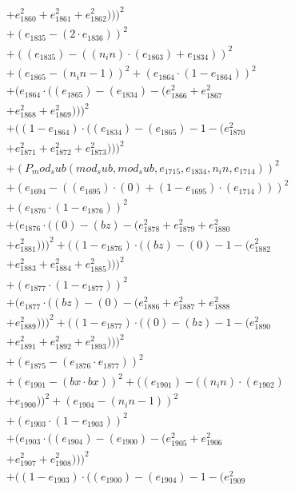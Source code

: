 \documentclass[10pt, a4paper]{article}
\begin{document}
\begin{align*}
& + e_{1860}^{2} + e_{1861}^{2} + e_{1862}^{2})))^{2} \\
& + (e_{1835} - (2  \cdot  e_{1836}))^{2} \\
& + ((e_{1835}) - ((n_in)  \cdot  (e_{1863}) + e_{1834}))^{2} \\
& + (e_{1865} - (n_in - 1))^{2} + (e_{1864}  \cdot  (1 - e_{1864}))^{2} \\
& + (e_{1864}  \cdot  ((e_{1865}) - (e_{1834}) - (e_{1866}^{2} + e_{1867}^{2} \\
& + e_{1868}^{2} + e_{1869}^{2})))^{2} \\
& + ((1 - e_{1864})  \cdot  ((e_{1834}) - (e_{1865}) - 1 - (e_{1870}^{2} \\
& + e_{1871}^{2} + e_{1872}^{2} + e_{1873}^{2})))^{2} \\
& + (P_mod_sub(mod_sub, mod_sub, e_{1715}, e_{1834}, n_in, e_{1714}))^{2} \\
& + (e_{1694} - ((e_{1695})  \cdot  (0) + (1 - e_{1695})  \cdot  (e_{1714})))^{2} \\
& + (e_{1876}  \cdot  (1 - e_{1876}))^{2} \\
& + (e_{1876}  \cdot  ((0) - (bz) - (e_{1878}^{2} + e_{1879}^{2} + e_{1880}^{2} \\
& + e_{1881}^{2})))^{2} + ((1 - e_{1876})  \cdot  ((bz) - (0) - 1 - (e_{1882}^{2} \\
& + e_{1883}^{2} + e_{1884}^{2} + e_{1885}^{2})))^{2} \\
& + (e_{1877}  \cdot  (1 - e_{1877}))^{2} \\
& + (e_{1877}  \cdot  ((bz) - (0) - (e_{1886}^{2} + e_{1887}^{2} + e_{1888}^{2} \\
& + e_{1889}^{2})))^{2} + ((1 - e_{1877})  \cdot  ((0) - (bz) - 1 - (e_{1890}^{2} \\
& + e_{1891}^{2} + e_{1892}^{2} + e_{1893}^{2})))^{2} \\
& + (e_{1875} - (e_{1876}  \cdot  e_{1877}))^{2} \\
& + (e_{1901} - (bx  \cdot  bx))^{2} + ((e_{1901}) - ((n_in)  \cdot  (e_{1902}) \\
& + e_{1900}))^{2} + (e_{1904} - (n_in - 1))^{2} \\
& + (e_{1903}  \cdot  (1 - e_{1903}))^{2} \\
& + (e_{1903}  \cdot  ((e_{1904}) - (e_{1900}) - (e_{1905}^{2} + e_{1906}^{2} \\
& + e_{1907}^{2} + e_{1908}^{2})))^{2} \\
& + ((1 - e_{1903})  \cdot  ((e_{1900}) - (e_{1904}) - 1 - (e_{1909}^{2} \\

\end{align*}
\end{document}
